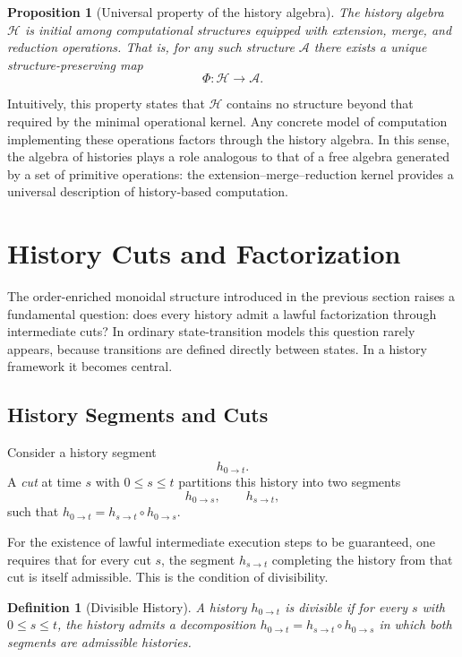 \documentclass[12pt]{article}
\newtheorem{definition}{Definition}
\newtheorem{proposition}{Proposition}
\begin{document}
\begin{proposition}[Universal property of the history algebra]
The history algebra $\mathcal{H}$ is initial among computational structures equipped with
extension, merge, and reduction operations. That is, for any such structure $\mathcal{A}$ there
exists a unique structure-preserving map
\[
\Phi : \mathcal{H} \to \mathcal{A}.
\]
\end{proposition}

Intuitively, this property states that $\mathcal{H}$ contains no structure beyond that required
by the minimal operational kernel. Any concrete model of computation implementing these
operations factors through the history algebra. In this sense, the algebra of histories plays
a role analogous to that of a free algebra generated by a set of primitive operations: the
extension--merge--reduction kernel provides a universal description of history-based computation.

\section{History Cuts and Factorization}
\label{sec:cuts}

The order-enriched monoidal structure introduced in the previous section raises a fundamental
question: does every history admit a lawful factorization through intermediate cuts? In
ordinary state-transition models this question rarely appears, because transitions are defined
directly between states. In a history framework it becomes central.

\subsection{History Segments and Cuts}

Consider a history segment
\[
h_{0 \to t}.
\]
A \emph{cut} at time $s$ with $0 \leq s \leq t$ partitions this history into two segments
\[
h_{0 \to s}, \qquad h_{s \to t},
\]
such that $h_{0 \to t} = h_{s \to t} \circ h_{0 \to s}$.

For the existence of lawful intermediate execution steps to be guaranteed, one requires that
for every cut $s$, the segment $h_{s \to t}$ completing the history from that cut is itself
admissible. This is the condition of divisibility.

\begin{definition}[Divisible History]
A history $h_{0 \to t}$ is \emph{divisible} if for every $s$ with $0 \leq s \leq t$, the
history admits a decomposition $h_{0 \to t} = h_{s \to t} \circ h_{0 \to s}$ in which both
segments are admissible histories.
\end{definition}
\end{document}
